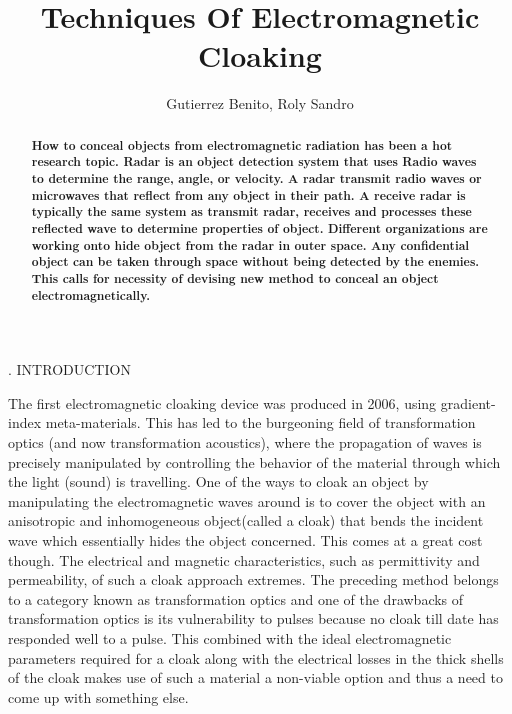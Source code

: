 \documentclass[12pt,letterpaper]{IEEEconf}
\title{\LARGE Techniques Of Electromagnetic Cloaking}
\author{Gutierrez Benito, Roly Sandro}
\begin{document}
\maketitle
\renewcommand{\section}[1]
{\addtocounter{section}{1}\begin{center}\arabic{section}. #1
\end{center}}

\thispagestyle{empty}
\pagestyle{empty}

\begin{abstract}\bf
	How to conceal objects from electromagnetic radiation has 
	been a hot research topic. Radar is an object detection 
	system that uses Radio waves to determine the range, angle,
	or velocity. A radar transmit radio waves or microwaves that 
	reflect from any object in their path. A receive radar is
	typically the same system as transmit radar, receives and
	processes these reflected wave to determine properties of
	object. Different organizations are working onto hide object
	from the radar in outer space. Any confidential object can be
	taken through space without being detected by the enemies.
	This calls for necessity of devising new method to conceal 
	an object electromagnetically.
\end{abstract}

\section{INTRODUCTION}
The first electromagnetic cloaking device was produced in 2006,
using gradient-index meta-materials. This has led to the 
burgeoning field of transformation optics (and now 
transformation acoustics), where the propagation of waves is
precisely manipulated by controlling the behavior of the
material through which the light (sound) is travelling.
One of the ways to cloak an object by manipulating the
electromagnetic waves around is to cover the object with an
anisotropic and inhomogeneous object(called a cloak) that bends
the incident wave which essentially hides the object concerned.
This comes at a great cost though. The electrical and magnetic
characteristics, such as permittivity and permeability, of such
a cloak approach extremes. The preceding method belongs to a 
category known as transformation optics and one of the drawbacks
of transformation optics is its vulnerability to pulses because 
no cloak till date has responded well to a pulse.
This  combined with the ideal electromagnetic parameters required
for a cloak along with the electrical losses in the thick shells
of the cloak makes use of such a material a non-viable option and
thus a need to come up with something else.
\end{document}
